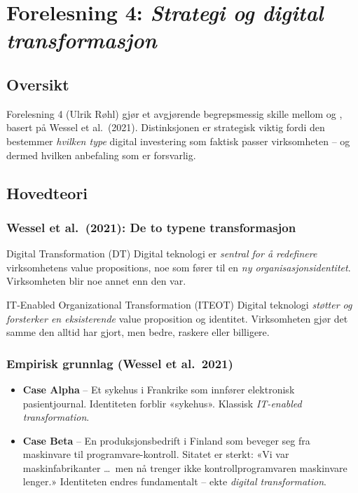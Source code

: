 \section{Forelesning 4: \emph{Strategi og digital transformasjon}}
\label{sec:lec04}

\subsection*{Oversikt}
Forelesning 4 (Ulrik Røhl) gjør et avgjørende begrepsmessig skille mellom
 og ,
basert på Wessel et al.\ (2021). Distinksjonen er strategisk viktig fordi den
bestemmer \emph{hvilken type} digital investering som faktisk passer
virksomheten -- og dermed hvilken anbefaling som er forsvarlig.

\subsection{Hovedteori}

\subsubsection*{Wessel et al.\ (2021): De to typene transformasjon}

\begin{definition}{Digital Transformation (DT)}
Digital teknologi er \emph{sentral for å redefinere} virksomhetens value
propositions, noe som fører til en \emph{ny organisasjonsidentitet}.
Virksomheten blir noe annet enn den var.
\end{definition}

\begin{definition}{IT-Enabled Organizational Transformation (ITEOT)}
Digital teknologi \emph{støtter og forsterker en eksisterende} value
proposition og identitet. Virksomheten gjør det samme den alltid har gjort,
men bedre, raskere eller billigere.
\end{definition}


\subsubsection*{Empirisk grunnlag (Wessel et al.\ 2021)}
\begin{itemize}
  \item \textbf{Case Alpha} -- Et sykehus i Frankrike som innfører elektronisk
    pasientjournal. Identiteten forblir «sykehus». Klassisk
    \emph{IT-enabled transformation}.
  \item \textbf{Case Beta} -- En produksjonsbedrift i Finland som beveger seg
    fra maskinvare til programvare-kontroll. Sitatet er sterkt: «Vi var
    maskinfabrikanter \ldots\ men nå trenger ikke kontrollprogramvaren
    maskinvare lenger.» Identiteten endres fundamentalt -- ekte
    \emph{digital transformation}.
\end{itemize}

